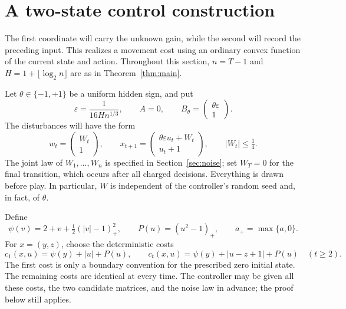 \documentclass[11pt]{article}
\theoremstyle{remark}
\begin{document}
\section{A two-state control construction}\label{sec:construction}

The first coordinate will carry the unknown gain, while the second will
record the preceding input. This realizes a movement cost using an ordinary
convex function of the current state and action. Throughout this section,
$n=T-1$ and $H=1+\lfloor\log_2 n\rfloor$ are as in Theorem~\ref{thm:main}.

Let $\theta\in\{-1,+1\}$ be a uniform hidden sign, and put
\begin{equation}\label{eq:epsilon}
 \varepsilon=\frac{1}{16H n^{1/3}},\qquad
 A=0,\qquad B_\theta=\begin{pmatrix}\theta\varepsilon\\1\end{pmatrix}.
\end{equation}
The disturbances will have the form
\begin{equation}\label{eq:system}
 w_t=\begin{pmatrix}W_t\\1\end{pmatrix},\qquad
 x_{t+1}=\begin{pmatrix}\theta\varepsilon u_t+W_t\\u_t+1\end{pmatrix},
 \qquad |W_t|\le\tfrac14.
\end{equation}
The joint law of $W_1,\ldots,W_n$ is specified in Section~\ref{sec:noise}; set $W_T=0$ for the final transition, which occurs after all charged decisions. Everything is drawn before play. In particular, $W$ is independent of the controller's random seed and, in fact, of $\theta$.

Define
\begin{equation}\label{eq:costparts}
 \psi(v)=2+v+\tfrac12(|v|-1)_+^2,
 \qquad P(u)=(u^2-1)_+,
 \qquad a_+=\max\{a,0\}.
\end{equation}
For $x=(y,z)$, choose the deterministic costs
\begin{equation}\label{eq:cost}
 c_1(x,u)=\psi(y)+|u|+P(u),\qquad
 c_t(x,u)=\psi(y)+|u-z+1|+P(u)\quad(t\ge2).
\end{equation}
The first cost is only a boundary convention for the prescribed zero initial state. The remaining costs are identical at every time. The controller may be given all these costs, the two candidate matrices, and the noise law in advance; the proof below still applies.
\end{document}
